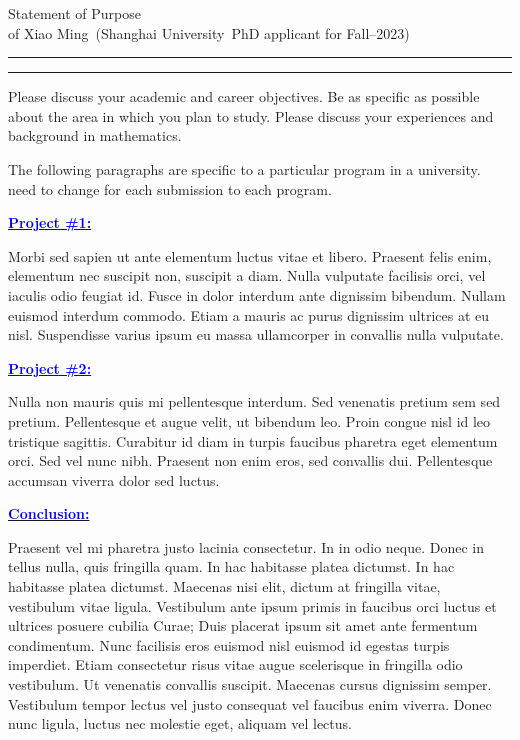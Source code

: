 \documentclass[12pt]{article}
\newcommand{\university}{Shanghai University}
\newcommand{\statement}[1]{\par\medskip
	\underline{\textcolor{blue}{\textbf{#1:}}}\space
}
\newcommand{\soptitle}{Statement of Purpose}
\newcommand{\yourname}{Xiao Ming}
\begin{document}
	
	\begin{center}\LARGE\soptitle\\
		\large of \yourname\ (\university\, PhD applicant for Fall--2023)
	\end{center}
	
	\hrule
	\vspace{1pt}
	\hrule height 1pt
	
	\bigskip
	
	
	Please discuss your academic and career objectives. Be as specific as possible about the area in which you plan to study. Please discuss your experiences and background in mathematics.
	
	 The following paragraphs are specific to a particular program in a university. need to change for each submission to each program.
	 
	\statement{Project \#1}
	Morbi sed sapien ut ante elementum luctus vitae et libero. Praesent
	felis enim, elementum nec suscipit non, suscipit a diam. Nulla
	vulputate facilisis orci, vel iaculis odio feugiat id. Fusce in dolor
	interdum ante dignissim bibendum. Nullam euismod interdum commodo.
	Etiam a mauris ac purus dignissim ultrices at eu nisl. Suspendisse
	varius ipsum eu massa ullamcorper in convallis nulla vulputate.
	
	\statement{Project \#2}
	Nulla non mauris quis mi pellentesque interdum. Sed venenatis pretium
	sem sed pretium. Pellentesque et augue velit, ut bibendum leo. Proin
	congue nisl id leo tristique sagittis. Curabitur id diam in turpis
	faucibus pharetra eget elementum orci. Sed vel nunc nibh. Praesent non
	enim eros, sed convallis dui. Pellentesque accumsan viverra dolor sed
	luctus.
	 \statement{Conclusion}
	 Praesent vel mi pharetra justo lacinia consectetur. In in odio neque.
	 Donec in tellus nulla, quis fringilla quam. In hac habitasse platea
	 dictumst. In hac habitasse platea dictumst. Maecenas nisi elit, dictum
	 at fringilla vitae, vestibulum vitae ligula. Vestibulum ante ipsum
	 primis in faucibus orci luctus et ultrices posuere cubilia Curae; Duis
	 placerat ipsum sit amet ante fermentum condimentum. Nunc facilisis
	 eros euismod nisl euismod id egestas turpis imperdiet. Etiam
	 consectetur risus vitae augue scelerisque in fringilla odio
	 vestibulum. Ut venenatis convallis suscipit. Maecenas cursus dignissim
	 semper. Vestibulum tempor lectus vel justo consequat vel faucibus enim
	 viverra. Donec nunc ligula, luctus nec molestie eget, aliquam vel
	 lectus.
	 
	 
	
\end{document}
